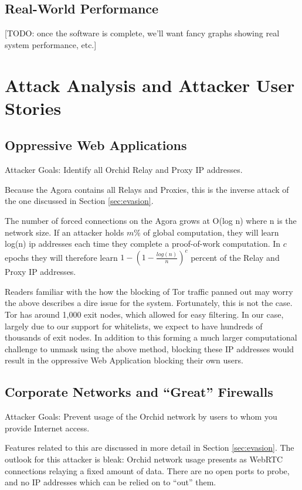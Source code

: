 \documentclass{article}
\newcommand{\orchid}{Orchid}
\newcommand{\Orchid}{\orchid}
\begin{document}
\subsection{Real-World Performance}

[TODO: once the software is complete, we'll want fancy graphs showing
  real system performance, etc.]

\section{Attack Analysis and Attacker User Stories}
\label{sec:attack-stories}

\subsection{Oppressive Web Applications}

Attacker Goals: Identify all \Orchid{} Relay and Proxy IP addresses.

Because the Agora contains all Relays and Proxies, this is the inverse
attack of the one discussed in Section \ref{sec:evasion}.

The number of forced connections on the Agora grows at O(log n) where
n is the network size. If an attacker holds $m\%$ of global
computation, they will learn log(n) ip addresses each time they
complete a proof-of-work computation. In $c$ epochs they will
therefore learn $1 - (1 - \frac{log(n)}{n})^c$ percent of the Relay and
Proxy IP addresses.

Readers familiar with the how the blocking of Tor traffic panned out
may worry the above describes a dire issue for the
system. Fortunately, this is not the case. Tor has around 1,000 exit
nodes, which allowed for easy filtering. In our case, largely due to
our support for whitelists, we expect to have hundreds of thousands of
exit nodes. In addition to this forming a much larger computational
challenge to unmask using the above method, blocking these IP
addresses would result in the oppressive Web Application blocking
their own users.

\subsection{Corporate Networks and ``Great'' Firewalls}

Attacker Goals: Prevent usage of the \Orchid{} network by users to whom
you provide Internet access.

Features related to this are discussed in more detail in Section
\ref{sec:evasion}. The outlook for this attacker is bleak: \Orchid{}
network usage presents as WebRTC connections relaying a fixed amount
of data. There are no open ports to probe, and no IP addresses which
can be relied on to ``out'' them.
\end{document}
